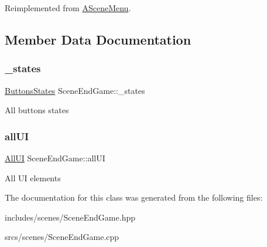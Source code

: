 Reimplemented from \hyperlink{class_a_scene_menu_a1deeb5fd9be97376998cd2af36f29744}{A\+Scene\+Menu}.



\subsection{Member Data Documentation}
\mbox{\label{class_scene_end_game_a6623f0b349cebe0722e15a62037e03ab}} 
\subsubsection{\texorpdfstring{\+\_\+states}{\_states}}
{\footnotesize\ttfamily \hyperlink{struct_scene_end_game_1_1_buttons_states}{Buttons\+States} Scene\+End\+Game\+::\+\_\+states\hspace{0.3cm}{\ttfamily [protected]}}

All buttons states \mbox{\label{class_scene_end_game_a1b73f55b0481fd3bb5bd1b0e396f5139}} 
\subsubsection{\texorpdfstring{all\+UI}{allUI}}
{\footnotesize\ttfamily \hyperlink{struct_scene_end_game_1_1_all_u_i}{All\+UI} Scene\+End\+Game\+::all\+UI\hspace{0.3cm}{\ttfamily [protected]}}

All UI elements 

The documentation for this class was generated from the following files\+:\begin{DoxyCompactItemize}
\item 
includes/scenes/Scene\+End\+Game.\+hpp\item 
srcs/scenes/Scene\+End\+Game.\+cpp\end{DoxyCompactItemize}
